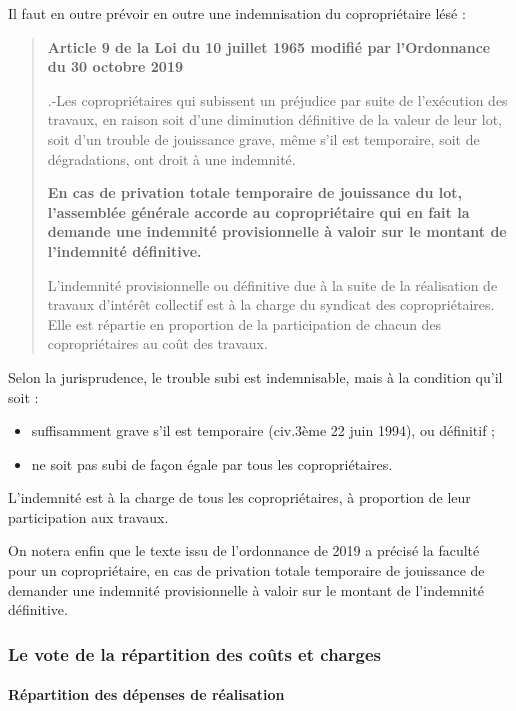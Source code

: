 			Il faut en outre prévoir en outre une indemnisation du copropriétaire lésé :
			\begin{quote}
				{\bfseries Article 9 de la Loi du 10 juillet 1965 modifié par l’Ordonnance du 30 octobre 2019}
				
				\III.-Les copropriétaires qui subissent un préjudice par suite de l'exécution des travaux, en raison soit d'une diminution définitive de la valeur de leur lot, soit d'un trouble de jouissance grave, même s'il est temporaire, soit de dégradations, ont droit à une indemnité.
				
				{\bfseries En cas de privation totale temporaire de jouissance du lot, l'assemblée générale accorde au copropriétaire qui en fait la demande une indemnité provisionnelle à valoir sur le montant de l'indemnité définitive.}
				
				L'indemnité provisionnelle ou définitive due à la suite de la réalisation de travaux d'intérêt collectif est à la charge du syndicat des copropriétaires. Elle est répartie en proportion de la participation de chacun des copropriétaires au coût des travaux.
			\end{quote}
			
			Selon la jurisprudence, le trouble subi est indemnisable, mais à la condition qu’il soit :
			\begin{itemize}
				\item suffisamment grave s’il est temporaire (civ.3ème 22 juin 1994), ou définitif ;
				\item ne soit pas subi de façon égale par tous les copropriétaires.
			\end{itemize}
			
			L’indemnité est à la charge de tous les copropriétaires, à proportion de leur participation aux travaux.
			
			On notera enfin que le texte issu de l’ordonnance de 2019 a précisé la faculté pour un copropriétaire, en cas de privation totale temporaire de jouissance de demander une indemnité provisionnelle à valoir sur le montant de l’indemnité définitive.
		
		\subsubsection{Le vote de la répartition des coûts et charges}
			
			\paragraph{Répartition des dépenses de réalisation}
			
